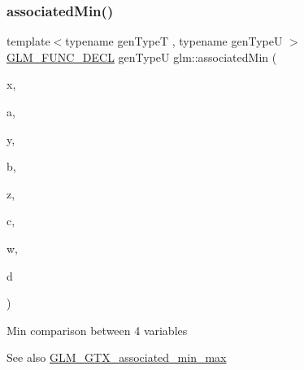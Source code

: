 \subsubsection{\texorpdfstring{associated\+Min()}{associatedMin()}\hspace{0.1cm}{\footnotesize\ttfamily [3/3]}}
{\footnotesize\ttfamily template$<$typename gen\+TypeT , typename gen\+TypeU $>$ \\
\hyperlink{setup_8hpp_ab2d052de21a70539923e9bcbf6e83a51}{G\+L\+M\+\_\+\+F\+U\+N\+C\+\_\+\+D\+E\+CL} gen\+TypeU glm\+::associated\+Min (\begin{DoxyParamCaption}\item[{const gen\+TypeT \&}]{x,  }\item[{const gen\+TypeU \&}]{a,  }\item[{const gen\+TypeT \&}]{y,  }\item[{const gen\+TypeU \&}]{b,  }\item[{const gen\+TypeT \&}]{z,  }\item[{const gen\+TypeU \&}]{c,  }\item[{const gen\+TypeT \&}]{w,  }\item[{const gen\+TypeU \&}]{d }\end{DoxyParamCaption})}

Min comparison between 4 variables \begin{DoxySeeAlso}{See also}
\hyperlink{group__gtx__associated__min__max}{G\+L\+M\+\_\+\+G\+T\+X\+\_\+associated\+\_\+min\+\_\+max} 
\end{DoxySeeAlso}
